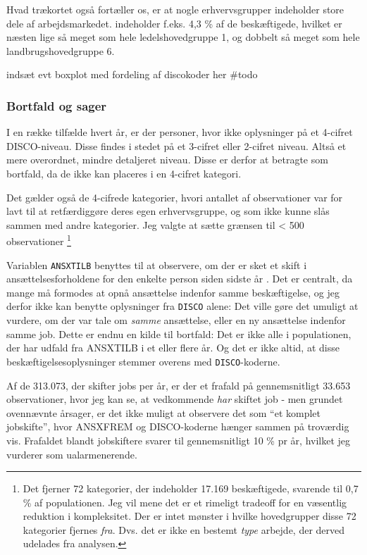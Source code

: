 Hvad trækortet også fortæller os, er at nogle erhvervsgrupper indeholder store dele af arbejdsmarkedet.  indeholder f.eks. 4,3 \% af de beskæftigede, hvilket er næsten lige så meget som hele ledelshovedgruppe 1, og dobbelt så meget som hele landbrugshovedgruppe 6. 

indsæt evt boxplot med fordeling af discokoder her \#todo

%
\subsubsection{Bortfald og sager}
%

I en række tilfælde hvert år, er der personer, hvor ikke oplysninger på et 4-cifret DISCO-niveau. Disse findes i stedet på et 3-cifret eller 2-cifret niveau. Altså et mere overordnet, mindre detaljeret niveau. Disse er derfor at betragte som bortfald, da de ikke kan placeres i en 4-cifret kategori. 

Det gælder også de 4-cifrede kategorier, hvori antallet af observationer var for lavt til at retfærdiggøre deres egen erhvervsgruppe, og som ikke kunne slås sammen med andre kategorier. Jeg valgte at sætte grænsen til < 500 observationer%
%
    \footnote{ Det fjerner 72 kategorier, der indeholder 17.169 beskæftigede, svarende til 0,7 \% af populationen. Jeg vil mene det er et rimeligt tradeoff for en væsentlig reduktion i kompleksitet. Der er intet mønster i hvilke hovedgrupper disse 72 kategorier fjernes \emph{fra}. Dvs. det er ikke en bestemt \emph{type} arbejde, der derved udelades fra analysen.}%
%

Variablen \texttt{ANSXTILB} benyttes til at observere, om der er sket et skift i ansættelsesforholdene for den enkelte person siden sidste år \parencite{DST-ANSXTILB}. Det er centralt, da mange må formodes at opnå ansættelse indenfor samme beskæftigelse, og jeg derfor ikke kan benytte oplysninger fra \texttt{DISCO} alene: Det ville gøre det umuligt at vurdere, om der var tale om \emph{samme} ansættelse, eller en ny ansættelse indenfor samme job. Dette er endnu en kilde til bortfald: Det er ikke alle i populationen, der har udfald fra ANSXTILB i et eller flere år. Og det er ikke altid, at disse beskæftigelsesoplysninger stemmer overens med \texttt{DISCO}-koderne.    

Af de 313.073, der skifter jobs per år, er der et frafald på gennemsnitligt 33.653 observationer, hvor jeg kan se, at vedkommende \emph{har} skiftet job - men grundet ovennævnte årsager, er det ikke muligt at observere det som “et komplet jobskifte”, hvor ANSXFREM og DISCO-koderne hænger sammen på troværdig vis. Frafaldet blandt jobskiftere svarer til gennemsnitligt 10 \% pr år, hvilket jeg vurderer som ualarmenerende. 


